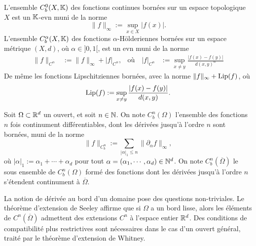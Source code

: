 \begin{definition}
\label{def:normeHolder}
%
	L'ensemble $C^0_b(X,\mathbb{K})$ des fonctions continues bornées sur un espace topologique $X$ est un $\mathbb{K}$-evn muni de la norme 
		\begin{equation}
			\|f\|_\infty := \sup_{x\in X} |f(x)|. 
		\end{equation}
L'ensemble $C^\alpha_b(X,\mathbb{K})$ des fonctions $\alpha$-Hölderiennes bornées sur un espace métrique $(X,d)$, où $\alpha \in ]0,1[$, est un evn muni de la norme 
		\begin{align}
			\|f\|_{C^\alpha} &:= \|f\|_\infty + |f|_{C^\alpha}, &
			\text{où}\quad
			|f|_{C^\alpha} &:= \sup_{x\neq y} \frac{|f(x)-f(y)|}{d(x,y)^\alpha}
		\end{align}
De même les fonctions Lipschitziennes bornées, avec la norme $\|f\|_\infty + \operatorname{Lip}(f)$, où 
\begin{align*}
	\operatorname{Lip}(f) := \sup_{x \neq y} \frac{|f(x)-f(y)|}{d(x,y)}.
\end{align*}
\end{definition}


\begin{definition}
\label{def:normeCnb}
%
	Soit $\Omega \subset \mathbb{R}^d$ un ouvert, et soit $n \in \mathbb{N}$.
	On note $C^n_b(\Omega)$ l'ensemble des fonctions $n$ fois continument différentiables, dont les dérivées jusqu'à l'ordre $n$ sont bornées, muni de la norme
	\begin{equation}
		\|f\|_{C^n_b} := \sum_{|\alpha|_1\leq n} \| \partial_\alpha f\|_\infty,
	\end{equation}
	où $|\alpha|_1 := \alpha_1+ \cdots+\alpha_d$ pour tout $\alpha = (\alpha_1,\cdots,\alpha_d) \in \mathbb{N}^d$. 
	On note $C^n_b(\overline \Omega)$ le sous ensemble de $C^n_b(\Omega)$ formé des fonctions dont les dérivées jusqu'à l'ordre $n$ s'étendent continument à $\overline \Omega$. 
\end{definition}


La notion de dérivée au bord d'un domaine pose des questions non-triviales. Le théorème d'extension de Seeley affirme que si $\Omega$ a un bord lisse, alors les éléments de $C^n(\overline \Omega)$ admettent des extensions $C^n$ à l'espace entier $\mathbb{R}^d$. 
Des conditions de compatibilité plus restrictives sont nécessaires dans le cas d'un ouvert général, traité par le théorème d'extension de Whitney. 

